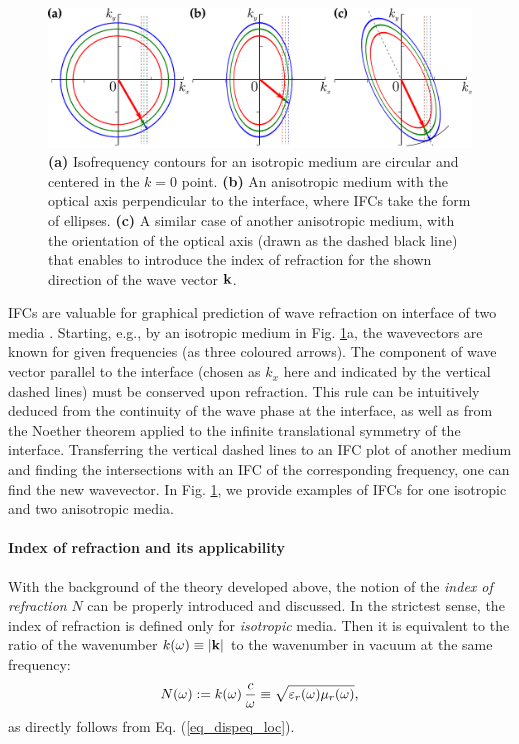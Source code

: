 \begin{figure}[ht] \caption{\textbf{(a)} Isofrequency contours for an isotropic medium are circular and centered in the $k=0$ point.  
		\textbf{(b)} An anisotropic medium with the optical axis perpendicular to the interface, where IFCs take the form of ellipses. \textbf{(c)} A similar case of another anisotropic medium, with the orientation of the optical axis (drawn as the dashed black line) that enables to introduce the index of refraction for the shown direction of the wave vector ${\mathbf{k}}$.
} \label{fg_ifc} \centering  %
	\includegraphics[width=.8\textwidth]{img/ifc_freqdispersion.pdf} 
\end{figure}
IFCs are valuable for graphical prediction of wave refraction on interface of two media \cite[p. 118]{shalaev2010book}. Starting, e.g., by an isotropic medium in Fig. \ref{fg_ifc}a, the wavevectors are known for given frequencies (as three coloured arrows).
The component of wave vector parallel to the interface (chosen as $k_x$ here and indicated by the vertical dashed lines) must be conserved upon refraction. This rule can be intuitively deduced from the continuity of the wave phase at the interface, as well as from the Noether theorem applied to the infinite translational symmetry of the interface. Transferring the vertical dashed lines to an IFC plot of another medium and finding the intersections with an IFC of the corresponding frequency, one can find the new wavevector. 
In Fig. \ref{fg_ifc}, we provide examples of IFCs for one isotropic and two anisotropic media.

\paragraph{Index of refraction and its applicability}  %
With the background of the theory developed above, the notion of the \textit{index of refraction} $N$ can be properly introduced and discussed. 
In the strictest sense, the index of refraction is defined only for \textit{isotropic} media. Then it is equivalent to the ratio of the wavenumber $k(\omega) \equiv |{\mathbf{k}}|$ to the wavenumber in vacuum at the same frequency: 
\begin{equation} N(\omega) := k(\omega) \, \frac{c}{\omega} \equiv \sqrt{\varepsilon_r(\omega)\mu_r(\omega)}, \label{eq_dispeqN}\end{equation}
as directly follows from Eq. (\ref{eq_dispeq_loc}).

